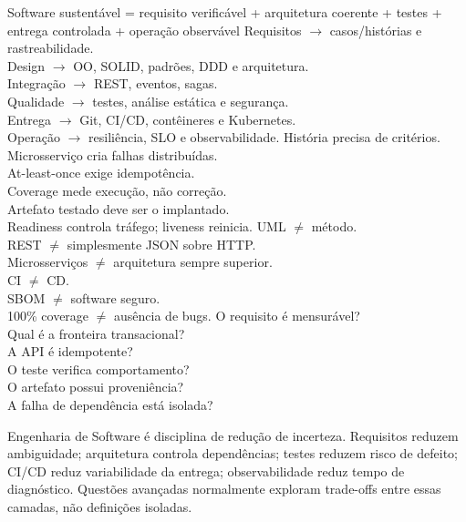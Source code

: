 {Software sustentável = requisito verificável + arquitetura coerente + testes + entrega controlada + operação observável}
{Requisitos $\rightarrow$ casos/histórias e rastreabilidade.\\Design $\rightarrow$ OO, SOLID, padrões, DDD e arquitetura.\\Integração $\rightarrow$ REST, eventos, sagas.\\Qualidade $\rightarrow$ testes, análise estática e segurança.\\Entrega $\rightarrow$ Git, CI/CD, contêineres e Kubernetes.\\Operação $\rightarrow$ resiliência, SLO e observabilidade.}
{História precisa de critérios.\\Microsserviço cria falhas distribuídas.\\At-least-once exige idempotência.\\Coverage mede execução, não correção.\\Artefato testado deve ser o implantado.\\Readiness controla tráfego; liveness reinicia.}
{UML $\neq$ método.\\REST $\neq$ simplesmente JSON sobre HTTP.\\Microsserviços $\neq$ arquitetura sempre superior.\\CI $\neq$ CD.\\SBOM $\neq$ software seguro.\\100\% coverage $\neq$ ausência de bugs.}
{O requisito é mensurável?\\Qual é a fronteira transacional?\\A API é idempotente?\\O teste verifica comportamento?\\O artefato possui proveniência?\\A falha de dependência está isolada?}

\begin{resumo}
Engenharia de Software é disciplina de redução de incerteza. Requisitos reduzem ambiguidade; arquitetura controla dependências; testes reduzem risco de defeito; CI/CD reduz variabilidade da entrega; observabilidade reduz tempo de diagnóstico. Questões avançadas normalmente exploram trade-offs entre essas camadas, não definições isoladas.
\end{resumo}
